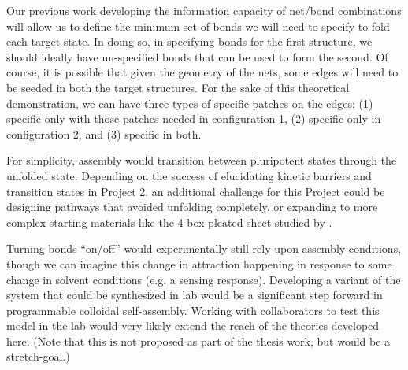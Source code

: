 Our previous work developing the information capacity of net/bond combinations will allow us to define the minimum set of bonds we will need to specify to fold each target state.
In doing so, in specifying bonds for the first structure, we should ideally have un-specified bonds that can be used to form the second.
Of course, it is possible that given the geometry of the nets, some edges will need to be seeded in both the target structures.
For the sake of this theoretical demonstration, we can have three types of specific patches on the edges: (1) specific only with those patches needed in configuration 1, (2) specific only in configuration 2, and (3) specific in both.

For simplicity, assembly would transition between pluripotent states through the unfolded state.
Depending on the success of elucidating kinetic barriers and transition states in Project 2, an additional challenge for this Project could be designing pathways that avoided unfolding completely, or expanding to more complex starting materials like the 4-box pleated sheet studied by \cite{An_2011_Robotica}. 

Turning bonds ``on/off'' would experimentally still rely upon assembly conditions, though we can imagine this change in attraction happening in response to some change in solvent conditions (e.g. a sensing response).
Developing a variant of the system that could be synthesized in lab would be a significant step forward in programmable colloidal self-assembly.
Working with collaborators to test this model in the lab would very likely extend the reach of the theories developed here.
(Note that this is not proposed as part of the thesis work, but would be a stretch-goal.)



